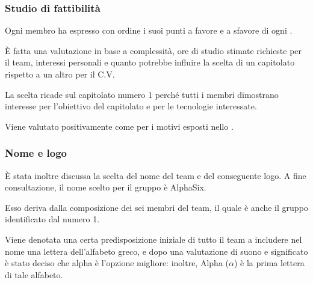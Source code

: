             \subsubsection{Studio di fattibilità}
            Ogni membro ha espresso con ordine i suoi punti a favore e a sfavore di ogni .\par
            È fatta una valutazione in base a complessità, ore di studio stimate richieste per il team, interessi personali e
            quanto potrebbe influire la scelta di un capitolato rispetto a un altro per il C.V.\par
            La scelta ricade sul capitolato numero 1 perché tutti i membri dimostrano interesse per l'obiettivo del capitolato
            e per le tecnologie interessate.\par
            Viene valutato positivamente come  per i motivi esposti nello \Doc{\SdFv}.

            \subsubsection{Nome e logo}
            È stata inoltre discussa la scelta del nome del team e del conseguente logo. A fine consultazione, il nome scelto
            per il gruppo è AlphaSix.\par
            Esso deriva dalla composizione dei sei membri del team, il quale è anche il gruppo identificato dal numero 1.\par
            Viene denotata una certa predisposizione iniziale di tutto il team a includere nel nome una lettera dell'alfabeto greco,
            e dopo una valutazione di suono e significato è stato deciso che alpha è l'opzione migliore: inoltre, Alpha ($\alpha$) è
            la prima lettera di tale alfabeto.

